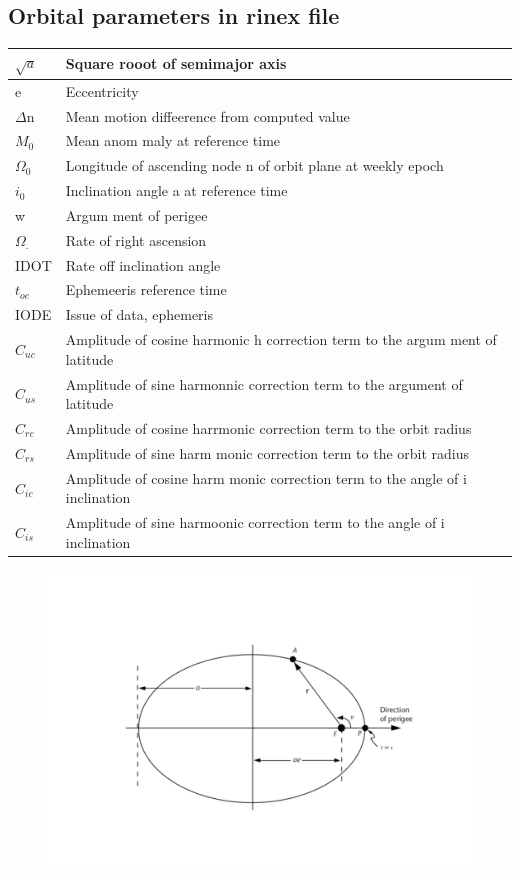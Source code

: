 \subsection{Orbital parameters in rinex file}
\begin{tabular}{ | m{10em} | m{10cm} | } 
  \hline
  $\sqrt{a}$   & Square rooot of semimajor axis \\
  \hline
  e & 
  Eccentricity \\  
  \hline
  $\Delta$n & Mean motion diffeerence from computed value  \\
  \hline
  $M_0$ & Mean anom
  maly at reference time \\
  \hline
  $\Omega_0$ & Longitude of ascending node
  n
  of orbit plane at weekly epoch  \\
  \hline
  $i_0$ & Inclination angle
  a
  at reference time   \\
  \hline
  w & Argum
  ment of perigee \\
  \hline
$\Omega_.$& Rate of right ascension  \\
  \hline
  IDOT & Rate off inclination angle  \\
  \hline
$t_{oe}$  & Ephemeeris reference time  \\
  \hline
  IODE  &  Issue of data, ephemeris \\
  \hline
  $C_{uc}$ & Amplitude of cosine harmonic
  h
  correction term to the
  argum
  ment of latitude   \\
  \hline
  $C_{us}$& Amplitude of sine harmonnic correction term to the argument
  of latitude \\
  \hline
  $C_{rc}$  &  Amplitude of cosine harrmonic correction term to the orbit
  radius \\
  \hline
  $C_{rs}$ & Amplitude of sine harm
  monic correction term to the orbit
  radius  \\
  \hline
  $C_{ic}$ & Amplitude of cosine harm
  monic correction term to the angle of
  i
  inclination \\
  \hline
  $C_{is}$ & Amplitude of sine harmoonic correction term to the angle of
  i
  inclination  \\
  \hline
\end{tabular}
\begin{figure}
\includegraphics[scale=0.4]{figs/1.pdf}
\end{figure}

